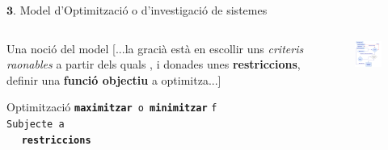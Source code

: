 \documentclass[twocolumn]{beamer}
\begin{document}
\begin{frame}{$\mathbf 3.$ Model d’Optimització o d’investigació de sistemes}
\begin{columns}[t]
\begin{column}{.5\textwidth}
	\begin{block}{Una noció del model}
		[...la gracià està en escollir uns \emph{criteris raonables}
		a partir dels quals , i donades unes \textbf{restriccions}, definir una \textbf{funció objectiu} a optimitza...]
	\end{block}

\begin{block}{Optimització}
\texttt{\textbf{maximitzar} o \textbf{minimitzar}} \texttt{f}
\\ 
\texttt{Subjecte a}
\\
$\quad $ \texttt{\textbf{restriccions}}
\end{block}
\end{column}
\begin{column}{.5\textwidth}
\begin{figure}
\includegraphics[width=6cm]{algor}
\end{figure}
\end{column}
\end{columns}
\end{frame}
\end{document}
